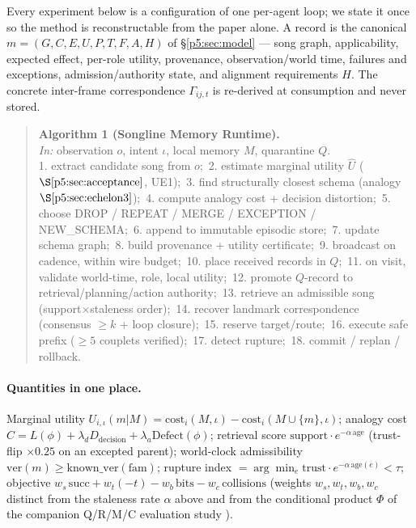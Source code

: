 \documentclass{article}
\begin{document}
Every experiment below is a configuration of one per-agent loop; we
state it once so the method is reconstructable from the paper alone.
A record is the canonical $m=(G,C,E,U,P,T,F,A,H)$ of
\S\ref{p5:sec:model} --- song graph, applicability, expected effect,
per-role utility, provenance, observation/world time, failures and
exceptions, admission/authority state, and alignment requirements
$H$. The concrete inter-frame correspondence $\Gamma_{ij,t}$ is
re-derived at consumption and never stored.

\begin{quote}\small
\textbf{Algorithm 1 (Songline Memory Runtime).}\\
\emph{In:} observation $o$, intent $\iota$, local memory $M$,
quarantine $Q$.\\
1. extract candidate song from $o$;\
2. estimate marginal utility $\widehat U$ ($\S\ref{p5:sec:acceptance}$,
UE1);\
3. find structurally closest schema (analogy $\S\ref{p5:sec:echelon3}$);\
4. compute analogy cost + decision distortion;\
5. choose DROP / REPEAT / MERGE / EXCEPTION / NEW\_SCHEMA;\
6. append to immutable episodic store;\
7. update schema graph;\
8. build provenance + utility certificate;\
9. broadcast on cadence, within wire budget;\
10. place received records in $Q$;\
11. on visit, validate world-time, role, local utility;\
12. promote $Q$-record to retrieval/planning/action authority;\
13. retrieve an admissible song (support$\times$staleness order);\
14. recover landmark correspondence (consensus $\ge k$ + loop
closure);\
15. reserve target/route;\
16. execute safe prefix ($\ge 5$ couplets verified);\
17. detect rupture;\
18. commit / replan / rollback.
\end{quote}

\paragraph{Quantities in one place.} Marginal utility
$U_{i,\iota}(m|M)=\mathrm{cost}_i(M,\iota)-\mathrm{cost}_i(M\cup\{m\},
\iota)$; analogy cost $C=L(\phi)+\lambda_d D_{\mathrm{decision}}
+\lambda_a\mathrm{Defect}(\phi)$; retrieval score
$\mathrm{support}\cdot e^{-\alpha\,\mathrm{age}}$ (trust-flip $\times
0.25$ on an excepted parent); world-clock admissibility
$\mathrm{ver}(m)\ge\mathrm{known\_ver}(\mathrm{fam})$; rupture index
$=\arg\min_e \mathrm{trust}\cdot e^{-\alpha\,\mathrm{age}(e)}<\tau$;
objective $w_s\,\mathrm{succ}+w_t(-t)-w_b\,\mathrm{bits}
-w_c\,\mathrm{collisions}$ (weights $w_s,w_t,w_b,w_c$ distinct from
the staleness rate $\alpha$ above and from the conditional product
$\Phi$ of the companion Q/R/M/C evaluation study \citep{songlines1}).
\end{document}
